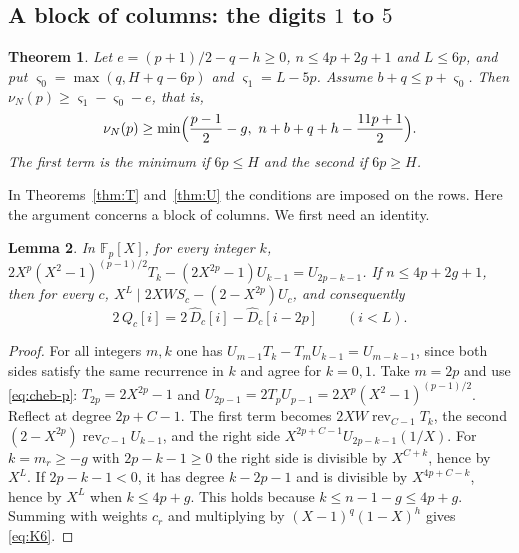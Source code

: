 \documentclass[11pt]{amsart}
\newtheorem{theorem}{Theorem}[section]
\newtheorem{lemma}[theorem]{Lemma}
\theoremstyle{definition}
\theoremstyle{remark}
\numberwithin{equation}{section}
\newcommand{\F}{\mathbb F}
\begin{document}
\subsection{A block of columns: the digits $1$ to $5$}
\begin{theorem}\label{thm:U6}
Let $e=(p+1)/2-q-h\ge0$, $n\le4p+2g+1$ and $L\le6p$, and put $\varsigma_0=\max(q,H+q-6p)$ and
$\varsigma_1=L-5p$. Assume $b+q\le p+\varsigma_0$. Then $\nu_N(p)\ge\varsigma_1-\varsigma_0-e$, that is,
\[
 \nu_N(p)\ge\min\Bigl(\frac{p-1}2-g,\ n+b+q+h-\frac{11p+1}2\Bigr).
\]
The first term is the minimum if $6p\le H$ and the second if $6p\ge H$.
\end{theorem}

In Theorems~\ref{thm:T} and~\ref{thm:U} the conditions are imposed on the rows. Here the argument concerns a
block of columns. We first need an identity.

\begin{lemma}\label{lem:K6}
In $\F_p[X]$, for every integer $k$, $2X^p(X^2-1)^{(p-1)/2}T_k-(2X^{2p}-1)U_{k-1}=U_{2p-k-1}$. If
$n\le4p+2g+1$, then for every $c$, $X^L\mid 2XWS_c-(2-X^{2p})U_c$, and consequently
\begin{equation}\label{eq:K6}
 2\,Q_c[i]=2\,\widehat D_c[i]-\widehat D_c[i-2p]\qquad(i<L).
\end{equation}
\end{lemma}

\begin{proof}
For all integers $m,k$ one has $U_{m-1}T_k-T_mU_{k-1}=U_{m-k-1}$, since both sides satisfy the same
recurrence in $k$ and agree for $k=0,1$. Take $m=2p$ and use \eqref{eq:cheb-p}: $T_{2p}=2X^{2p}-1$ and
$U_{2p-1}=2T_pU_{p-1}=2X^p(X^2-1)^{(p-1)/2}$. Reflect at degree $2p+C-1$. The first term becomes
$2XW\operatorname{rev}_{C-1}T_k$, the second $(2-X^{2p})\operatorname{rev}_{C-1}U_{k-1}$, and the right side
$X^{2p+C-1}U_{2p-k-1}(1/X)$. For $k=m_r\ge-g$ with $2p-k-1\ge0$ the right side is divisible by $X^{C+k}$, hence
by $X^L$. If $2p-k-1<0$, it has degree $k-2p-1$ and is divisible by $X^{4p+C-k}$, hence by $X^L$ when
$k\le4p+g$. This holds because $k\le n-1-g\le4p+g$. Summing with weights $c_r$ and multiplying by
$(X-1)^q(1-X)^h$ gives \eqref{eq:K6}.
\end{proof}
\end{document}
